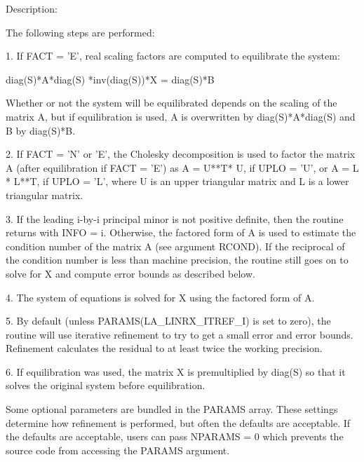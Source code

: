 \begin{DoxyParagraph}{Description\+: }
\begin{DoxyVerb}    The following steps are performed:

    1. If FACT = 'E', real scaling factors are computed to equilibrate
    the system:

      diag(S)*A*diag(S)     *inv(diag(S))*X = diag(S)*B

    Whether or not the system will be equilibrated depends on the
    scaling of the matrix A, but if equilibration is used, A is
    overwritten by diag(S)*A*diag(S) and B by diag(S)*B.

    2. If FACT = 'N' or 'E', the Cholesky decomposition is used to
    factor the matrix A (after equilibration if FACT = 'E') as
       A = U**T* U,  if UPLO = 'U', or
       A = L * L**T,  if UPLO = 'L',
    where U is an upper triangular matrix and L is a lower triangular
    matrix.

    3. If the leading i-by-i principal minor is not positive definite,
    then the routine returns with INFO = i. Otherwise, the factored
    form of A is used to estimate the condition number of the matrix
    A (see argument RCOND).  If the reciprocal of the condition number
    is less than machine precision, the routine still goes on to solve
    for X and compute error bounds as described below.

    4. The system of equations is solved for X using the factored form
    of A.

    5. By default (unless PARAMS(LA_LINRX_ITREF_I) is set to zero),
    the routine will use iterative refinement to try to get a small
    error and error bounds.  Refinement calculates the residual to at
    least twice the working precision.

    6. If equilibration was used, the matrix X is premultiplied by
    diag(S) so that it solves the original system before
    equilibration.\end{DoxyVerb}
 \begin{DoxyVerb}     Some optional parameters are bundled in the PARAMS array.  These
     settings determine how refinement is performed, but often the
     defaults are acceptable.  If the defaults are acceptable, users
     can pass NPARAMS = 0 which prevents the source code from accessing
     the PARAMS argument.\end{DoxyVerb}

\end{DoxyParagraph}


